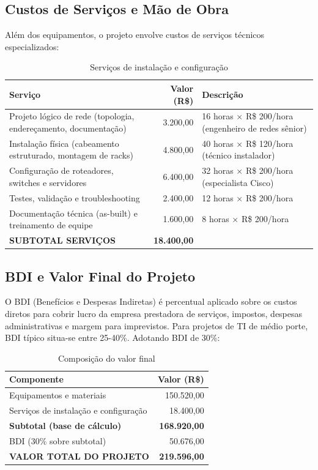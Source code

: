 \documentclass[12pt,a4paper]{article}
\begin{document}
\subsection{Custos de Serviços e Mão de Obra}

Além dos equipamentos, o projeto envolve custos de serviços técnicos especializados:

\begin{table}[H]
\centering
\caption{Serviços de instalação e configuração}
\begin{tabularx}{\textwidth}{@{}lrX@{}}
\toprule
\textbf{Serviço} & \textbf{Valor (R\$)} & \textbf{Descrição} \\ \midrule
Projeto lógico de rede (topologia, endereçamento, documentação) & 3.200,00 & 16 horas × R\$ 200/hora (engenheiro de redes sênior) \\
Instalação física (cabeamento estruturado, montagem de racks) & 4.800,00 & 40 horas × R\$ 120/hora (técnico instalador) \\
Configuração de roteadores, switches e servidores & 6.400,00 & 32 horas × R\$ 200/hora (especialista Cisco) \\
Testes, validação e troubleshooting & 2.400,00 & 12 horas × R\$ 200/hora \\
Documentação técnica (as-built) e treinamento de equipe & 1.600,00 & 8 horas × R\$ 200/hora \\ \midrule
\textbf{SUBTOTAL SERVIÇOS} & \textbf{18.400,00} & \\ \bottomrule
\end{tabularx}
\end{table}

\subsection{BDI e Valor Final do Projeto}

O BDI (Benefícios e Despesas Indiretas) é percentual aplicado sobre os custos diretos para cobrir lucro da empresa prestadora de serviços, impostos, despesas administrativas e margem para imprevistos. Para projetos de TI de médio porte, BDI típico situa-se entre 25-40\%. Adotando BDI de 30\%:

\begin{table}[H]
\centering
\caption{Composição do valor final}
\begin{tabular}{@{}lr@{}}
\toprule
\textbf{Componente} & \textbf{Valor (R\$)} \\ \midrule
Equipamentos e materiais & 150.520,00 \\
Serviços de instalação e configuração & 18.400,00 \\ \midrule
\textbf{Subtotal (base de cálculo)} & \textbf{168.920,00} \\[0.2cm]
BDI (30\% sobre subtotal) & 50.676,00 \\ \midrule
\textbf{VALOR TOTAL DO PROJETO} & \textbf{219.596,00} \\ \bottomrule
\end{tabular}
\end{table}
\end{document}
